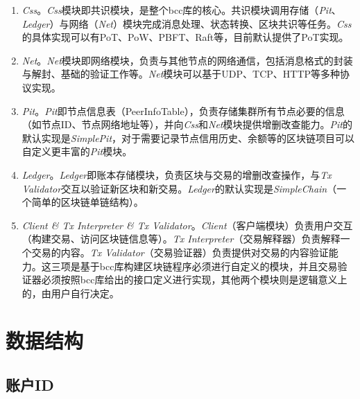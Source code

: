 \begin{enumerate}
    \item \textit{Css}。\textit{Css}模块即共识模块，是整个bcc库的核心。共识模块调用存储（\textit{Pit}、\textit{Ledger}）与网络（\textit{Net}）模块完成消息处理、状态转换、区块共识等任务。\textit{Css}的具体实现可以有PoT、PoW、PBFT、Raft等，目前默认提供了PoT实现。
	\item \textit{Net}。\textit{Net}模块即网络模块，负责与其他节点的网络通信，包括消息格式的封装与解封、基础的验证工作等。\textit{Net}模块可以基于UDP、TCP、HTTP等多种协议实现。
	\item \textit{Pit}。\textit{Pit}即节点信息表（PeerInfoTable），负责存储集群所有节点必要的信息（如节点ID、节点网络地址等），并向\textit{Css}和\textit{Net}模块提供增删改查能力。\textit{Pit}的默认实现是\textit{SimplePit}，对于需要记录节点信用历史、余额等的区块链项目可以自定义更丰富的\textit{Pit}模块。
	\item \textit{Ledger}。\textit{Ledger}即账本存储模块，负责区块与交易的增删改查操作，与\textit{Tx Validator}交互以验证新区块和新交易。\textit{Ledger}的默认实现是\textit{SimpleChain}（一个简单的区块链单链结构）。
	\item \textit{Client \& Tx Interpreter \& Tx Validator}。\textit{Client}（客户端模块）负责用户交互（构建交易、访问区块链信息等）。\textit{Tx Interpreter}（交易解释器）负责解释一个交易的内容。\textit{Tx Validator}（交易验证器）负责提供对交易的内容验证能力。这三项是基于bcc库构建区块链程序必须进行自定义的模块，并且交易验证器必须按照bcc库给出的接口定义进行实现，其他两个模块则是逻辑意义上的，由用户自行决定。%
\end{enumerate}


\section{数据结构}

\subsection{账户ID}

